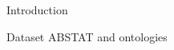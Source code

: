 \documentclass{beamer}
\begin{document}
\begin{frame}{Introduction}
\end{frame}

\begin{frame}{Dataset ABSTAT and ontologies}
\end{frame}


\end{document}
